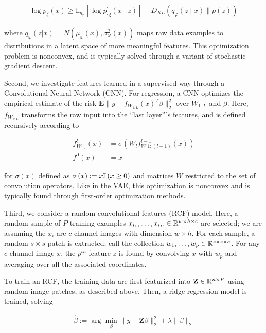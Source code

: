 \begin{align*}
\log p_{\xi}\left(x\right) \geq  \mathbb{E}_{q_{\varphi}}\left[\log p]_{\xi}(x \mid z)\right]-D_{KL}\left(q_{\varphi}(z \mid x) \| p(z)\right)
\end{align*}

where $q_{\varphi}\left(z \vert x\right) = N\left(\mu_{\varphi}\left(x\right), \sigma^{2}_{\varphi}\left(x\right)\right)$ maps raw data examples to distributions in a latent space of more meaningful features. This optimization problem is nonconvex, and is typically solved through a variant of stochastic gradient descent.

Second, we investigate features learned in a supervised way through a
Convolutional Neural Network (CNN). For regression, a CNN optimizes the
empirical estimate of the risk $\mathbf{E}\|y -
f_{W_{1:L}}\left(x\right)^{T}\beta\|_{2}^{2}$ over $W_{1:L}$ and $\beta$. Here,
$f_{W_{1:L}}$ transforms the raw input into the ``last layer''’s features, and
is defined recursively according to

\begin{align*}
f^{l}_{W_{1:l}}\left(x\right) &= \sigma\left(W_{l}f^{l - 1}_{W\_{1:(l - 1)}}\left(x\right)\right)\\
f^{0}\left(x\right) &= x
\end{align*}

for $\sigma\left(x\right)$ defined as $\sigma\left(x\right) := x \mathbb{I}\left({x \geq
  0}\right)$ and matrices $W$ restricted to the set of convolution operators. Like in
the VAE, this optimization is nonconvex and is typically found through
first-order optimization methods.

Third, we consider a random convolutional features (RCF) model. Here, a random
sample of $P$ training examples $x_{i_1}, \dots, x_{i_P} \in \mathbb{R}^{w \times h
  \times c}$ are selected; we are assuming the $x_{i}$ are $c$-channel images
with dimension $w\times h$. For each sample, a random $s \times s$ patch is
extracted; call the collection $w_{1}, \dots, w_{p} \in \mathbb{R}^{s \times s
  \times c}$. For any $c$-channel image $x$, the $p^{th}$ feature $z$ is found
by convolving $x$ with $w_{p}$ and averaging over all the associated
coordinates.

To train an RCF, the training data are first featurized into $\mathbf{Z} \in
\mathbb{R}^{n \times P}$ using random image patches, as described above. Then, a
ridge regression model is trained, solving

\begin{align*}
\hat{\beta} := \arg \min_{\beta} \|y - \mathbf{Z}\beta\|_{2}^{2} + \lambda \|\beta\|_{2}
\end{align*}

